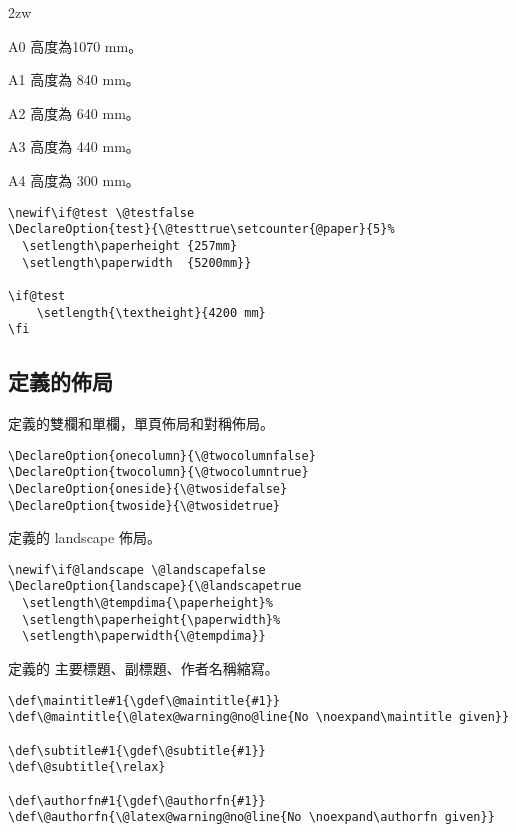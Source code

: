 \par{}
\begin{biao}[高度]\leftskip 2zw
\item[A0] 高度為1070 mm。
\item[A1] 高度為 840 mm。
\item[A2] 高度為 640 mm。
\item[A3]	高度為 440 mm。
\item[A4] 高度為 300 mm。
\end{biao}

\begin{lstlisting}[firstnumber=36]
\newif\if@test \@testfalse
\DeclareOption{test}{\@testtrue\setcounter{@paper}{5}%
  \setlength\paperheight {257mm}
  \setlength\paperwidth  {5200mm}}

\if@test
	\setlength{\textheight}{4200 mm}
\fi
\end{lstlisting}

\subsection{定義的佈局}

\par 定義的雙欄和單欄，單頁佈局和對稱佈局。
\begin{lstlisting}[firstnumber=45]
\DeclareOption{onecolumn}{\@twocolumnfalse}
\DeclareOption{twocolumn}{\@twocolumntrue}
\DeclareOption{oneside}{\@twosidefalse}
\DeclareOption{twoside}{\@twosidetrue}
\end{lstlisting}

\par 定義的 landscape 佈局。
\begin{lstlisting}[firstnumber=51]
\newif\if@landscape \@landscapefalse
\DeclareOption{landscape}{\@landscapetrue
  \setlength\@tempdima{\paperheight}%
  \setlength\paperheight{\paperwidth}%
  \setlength\paperwidth{\@tempdima}}
\end{lstlisting}


\par 定義的 主要標題、副標題、作者名稱縮寫。
\begin{lstlisting}[firstnumber=58]
\def\maintitle#1{\gdef\@maintitle{#1}}
\def\@maintitle{\@latex@warning@no@line{No \noexpand\maintitle given}}

\def\subtitle#1{\gdef\@subtitle{#1}}
\def\@subtitle{\relax}

\def\authorfn#1{\gdef\@authorfn{#1}}
\def\@authorfn{\@latex@warning@no@line{No \noexpand\authorfn given}}
\end{lstlisting}


